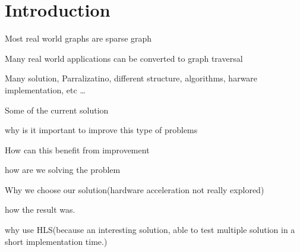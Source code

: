 \chapter{Introduction} \label{intro}

\begin{list_type}  
\item Most real world graphs are sparse graph
\item Many real world applications can be converted to graph traversal
\item Many solution, Parralizatino, different structure, algorithms, harware implementation, etc \ldots 
\item Some of the current solution
\item why is it important to improve this type of problems
\item How can this benefit from improvement
\item how are we solving the problem
\item Why we choose our solution(hardware acceleration not really explored)
\item how the result was.
\item why use HLS(because an interesting solution, able to test multiple solution in a short implementation time.)
\end{list_type}